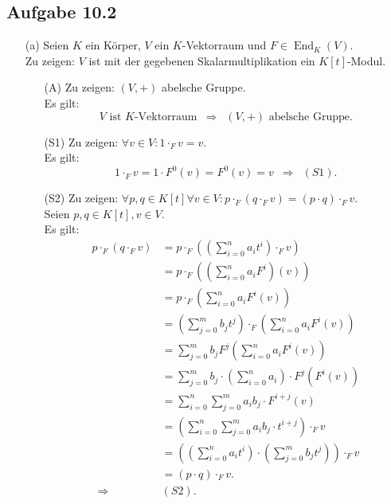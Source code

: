 \documentclass[12pt]{article}
\newcommand{\df}{\enspace\Longrightarrow\enspace}
\newcommand{\kendo}{\operatorname{End}}
\begin{document}
\subsection*{Aufgabe 10.2}
\begin{enumerate}
	\item[(a)] Seien $K$ ein Körper, $V$ ein $K$-Vektorraum und $F\in\kendo_K(V)$. \\
	Zu zeigen: $V$ ist mit der gegebenen Skalarmultiplikation ein $K[t]$-Modul. \\
	\begin{enumerate}
		\item[(A)] Zu zeigen: $(V,+)$ abelsche Gruppe. \\
		Es gilt: $$V\text{ ist }K\text{-Vektorraum}\df(V,+)\text{ abelsche Gruppe}.$$
		
		\item[(S1)] Zu zeigen: $\forall v\in V:1\cdot_F v=v$. \\
		Es gilt: $$1\cdot_F v=1\cdot F^0(v)=F^0(v)=v\df(S1).$$
		
		\item[(S2)] Zu zeigen: $\forall p,q\in K[t]\forall v\in V: p\cdot_F(q\cdot_F v)=(p\cdot q)\cdot_F v$. \\
		Seien $p,q\in K[t], v\in V$. \\
		Es gilt:
		\begin{align*}
			p\cdot_F(q\cdot_F v)&=p\cdot_F\left(\left(\sum_{i=0}^{n}a_it^i\right)\cdot_F v\right) \\
			&=p\cdot_F\left(\left(\sum_{i=0}^{n}a_iF^i\right)(v)\right) \\
			&=p\cdot_F\left(\sum_{i=0}^{n}a_iF^i(v)\right) \\
			&=\left(\sum_{j=0}^{m}b_jt^j\right)\cdot_F\left(\sum_{i=0}^{n}a_iF^i(v)\right) \\
			&=\sum_{j=0}^{m}b_jF^j(\sum_{i=0}^{n}a_iF^i(v)) \\
			&=\sum_{j=0}^{m}b_j\cdot(\sum_{i=0}^{n}a_i)\cdot F^j(F^i(v)) \\
			&=\sum_{i=0}^{n}\sum_{j=0}^{m}a_ib_j\cdot F^{i+j}(v) \\
			&=\left(\sum_{i=0}^{n}\sum_{j=0}^{m}a_ib_j\cdot t^{i+j}\right)\cdot_F v \\
			&=\left(\left(\sum_{i=0}^{n}a_it^i\right)\cdot\left(\sum_{j=0}^{m}b_jt^j\right)\right)\cdot_F v \\
			&=(p\cdot q)\cdot_F v. \\
			\df&(S2).
		\end{align*}
		

\end{enumerate}
\end{enumerate}
\end{document}
